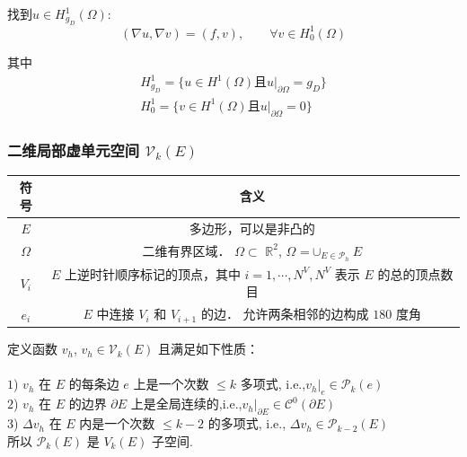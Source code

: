 \documentclass[12pt]{article}
\begin{document}
\begin{CJK}{UTF8}{gkai}
     找到$ u \in H_{g_D}^{1}(\Omega)$:
     \begin{equation}
     (\nabla u,\nabla v)=(f,v) ,\qquad \forall v \in H_0^1(\Omega)
     \end{equation}
     
     其中
     \begin{gather}
     H_{g_D}^{1}=\{u \in H^1(\Omega)\text{且}u|_{ \partial \Omega} = g_D\}\\
     H_{0}^{1}=\{v \in H^1(\Omega)\text{且}u|_{ \partial \Omega} =0\}
     \end{gather}
     
      \subsubsection{二维局部虚单元空间 $\mathcal V_k(E)$}
     \begin{table}[H]
     	\centering
     \begin{tabular}{ cc }   
     	\hline
     	符号 & 含义 \\
     	\hline
     	$E$ & 多边形，可以是非凸的 \\
     	
     	$\Omega$ & 二维有界区域． $\Omega$$\subset$ $\mathbb{R}^2$, $\Omega$ =$\cup_{E\in \mathcal{P}_h}E$ \\
     
     	$V_i$ & $E$ 上逆时针顺序标记的顶点，其中 $i = 1,\cdots, N^V,N^V$ 表示 $E$ 的总的顶点数目 \\
     	
     	$e_i$ & $E$ 中连接 $V_i$ 和 $V_{i+1}$ 的边． 允许两条相邻的边构成 $180$ 度角 \\
     	\hline
     \end{tabular}
     \end{table}
     
    定义函数 $v_h$, $v_h\in\mathcal V_k(E)$ 且满足如下性质：\\
    \\
    $1$) $v_h$ 在 $E$ 的每条边 $e$ 上是一个次数 $\le k$ 多项式, i.e.,$v_h|_e \in \mathcal P_k(e)$\\
    $2$) $v_h$ 在 $E$ 的边界 $\partial E$ 上是全局连续的,i.e.,$v_h|_{\partial E} \in \mathcal C^0(\partial E)$\\
    $3$) $\Delta v_h$ 在 $E$ 内是一个次数 $\le k - 2$ 的多项式, i.e., $\Delta v_h \in \mathcal P_{k-2}(E)$\\
    
    所以 $\mathcal{P}_k(E)$ 是 $V_k(E)$ 子空间. \\
    

\end{CJK}
\end{document}
